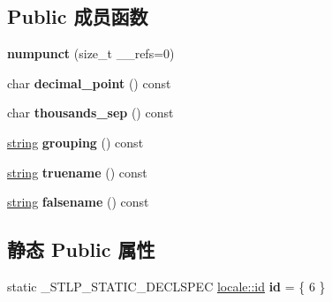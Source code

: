\subsection*{Public 成员函数}
\begin{DoxyCompactItemize}
\item 
\mbox{\label{classnumpunct_3_01char_01_4_ac434063ba2f6f87b4bfb15584f88ab8a}} 
{\bfseries numpunct} (size\+\_\+t \+\_\+\+\_\+refs=0)
\item 
\mbox{\label{classnumpunct_3_01char_01_4_aed04bf014ce1beb6b6c4ce67a4a9cdf6}} 
char {\bfseries decimal\+\_\+point} () const
\item 
\mbox{\label{classnumpunct_3_01char_01_4_a62ff3f93c0f415b4e950cda73d5e4763}} 
char {\bfseries thousands\+\_\+sep} () const
\item 
\mbox{\label{classnumpunct_3_01char_01_4_a3f8f04eb3185c91b87c836e2a0040263}} 
\hyperlink{structstring}{string} {\bfseries grouping} () const
\item 
\mbox{\label{classnumpunct_3_01char_01_4_a8bef55964bd33591db44118669cc1f7f}} 
\hyperlink{structstring}{string} {\bfseries truename} () const
\item 
\mbox{\label{classnumpunct_3_01char_01_4_a83c492bc286ba81430ca05d54bc39124}} 
\hyperlink{structstring}{string} {\bfseries falsename} () const
\end{DoxyCompactItemize}
\subsection*{静态 Public 属性}
\begin{DoxyCompactItemize}
\item 
\mbox{\label{classnumpunct_3_01char_01_4_ae43cb0e43cb7caa8267ebc71793861e7}} 
static \+\_\+\+S\+T\+L\+P\+\_\+\+S\+T\+A\+T\+I\+C\+\_\+\+D\+E\+C\+L\+S\+P\+EC \hyperlink{classlocale_1_1id}{locale\+::id} {\bfseries id} = \{ 6 \}
\end{DoxyCompactItemize}
